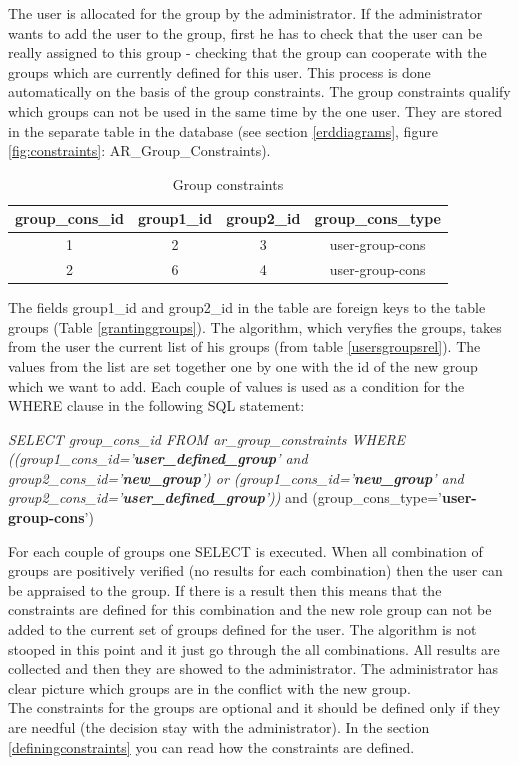 The user is allocated for the group by the administrator. If the administrator wants to add the user to the group, first he has to check that the user can be really assigned to this group - checking that the group can cooperate with the groups which are currently defined for this user. This process is done automatically on the basis of the group constraints. The group constraints qualify which groups can not be used in the same time by the one user. They are stored in the separate table in the database (see section \ref{erddiagrams}, figure \ref{fig:constraints}: AR\_Group\_Constraints).\\
\begin{table}[h]
\begin{center}\begin{tabular}{|c|c|c|c|}
\hline 
group\_cons\_id&group1\_id&group2\_id&group\_cons\_type\tabularnewline
\hline
\hline
1&2&3&user-group-cons\tabularnewline
\hline 
2&6&4&user-group-cons\tabularnewline
\hline 
\end{tabular}\end{center}
\caption{Group constraints} \label{groupconstraints}
\end{table}

The fields group1\_id and group2\_id in the table are foreign keys to the table groups (Table \ref{grantinggroups}).
The algorithm, which veryfies the groups, takes from the user the current list of his groups (from table \ref{usersgroupsrel}). The values from the list are set together one by one with the id of the new group which we want to add. Each couple of values is used as a condition for the WHERE clause in the following SQL statement:
\begin{center}\emph{SELECT group\_cons\_id FROM ar\_group\_constraints WHERE
((group1\_cons\_id='}\textbf{\emph{user\_defined\_group}}\emph{' and group2\_cons\_id='}\textbf{\emph{new\_group}}\emph{') or (group1\_cons\_id='}\textbf{\emph{new\_group}}\emph{' and group2\_cons\_id='}\textbf{\emph{user\_defined\_group}}\emph{'))} and (group\_cons\_type='\textbf{user-group-cons}')\end{center}

For each couple of groups one SELECT is executed. When all combination of groups are positively verified (no results for each combination) then the user can be appraised to the group. If there is a result then this means that the constraints are defined for this combination and the new role group can not be added to the current set of groups defined for the user. The algorithm is not stooped in this point and it just go through the all combinations. All results are collected and then they are showed to the administrator. The administrator has clear picture which groups are in the conflict with the new group.\\
The constraints for the groups are optional and it should be defined only if they are needful (the decision stay with the administrator). In the section \ref{definingconstraints} you can read how the constraints are defined.

